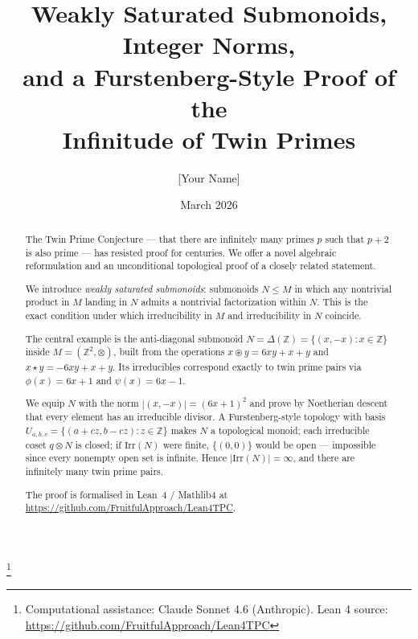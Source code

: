 \documentclass[11pt,a4paper]{amsart}
\theoremstyle{plain}
\theoremstyle{definition}
\theoremstyle{remark}
\newcommand{\mstar}{\mathbin{\circledast}}  %
\newcommand{\sstar}{\mathbin{\star}}        %
\newcommand{\tens}{\mathbin{\otimes}}       %
\newcommand{\Z}{\mathbb{Z}}
\newcommand{\Irr}{\mathrm{Irr}}
\newcommand{\phii}{\phi}                   %
\newcommand{\psii}{\psi}                   %
\begin{document}

\title{Weakly Saturated Submonoids, Integer Norms,\\
       and a Furstenberg-Style Proof of the\\
       Infinitude of Twin Primes}

\author{[Your Name]}
\thanks{Computational assistance: Claude Sonnet 4.6 (Anthropic).
        Lean 4 source: \url{https://github.com/FruitfulApproach/Lean4TPC}}
\date{March 2026}

\begin{abstract}
The Twin Prime Conjecture --- that there are infinitely many primes $p$ such
that $p+2$ is also prime --- has resisted proof for centuries.  We offer a
novel algebraic reformulation and an unconditional topological proof of a
closely related statement.

We introduce \emph{weakly saturated submonoids}: submonoids $N \leqslant M$
in which any nontrivial product in $M$ landing in $N$ admits a nontrivial
factorization within $N$.  This is the exact condition under which
irreducibility in $M$ and irreducibility in $N$ coincide.

The central example is the anti-diagonal submonoid
$N = \Delta(\Z) = \{(x,-x) : x \in \Z\}$
inside $M = (\Z^2, \tens)$, built from the operations
$x \mstar y = 6xy+x+y$ and $x \sstar y = -6xy+x+y$.
Its irreducibles correspond exactly to twin prime pairs via
$\phii(x) = 6x+1$ and $\psii(x) = 6x-1$.

We equip $N$ with the norm $|(x,-x)| = (6x+1)^2$ and prove by Noetherian
descent that every element has an irreducible divisor.  A Furstenberg-style
topology with basis $U_{a,b,c} = \{(a+cz,b-cz):z\in\Z\}$ makes $N$ a
topological monoid; each irreducible coset $q \tens N$ is closed; if
$\Irr(N)$ were finite, $\{(0,0)\}$ would be open --- impossible since every
nonempty open set is infinite.  Hence $|\Irr(N)| = \infty$, and there are
infinitely many twin prime pairs.

The proof is formalised in Lean~4 / Mathlib4 at
\url{https://github.com/FruitfulApproach/Lean4TPC}.
\end{abstract}

\maketitle

\end{document}
